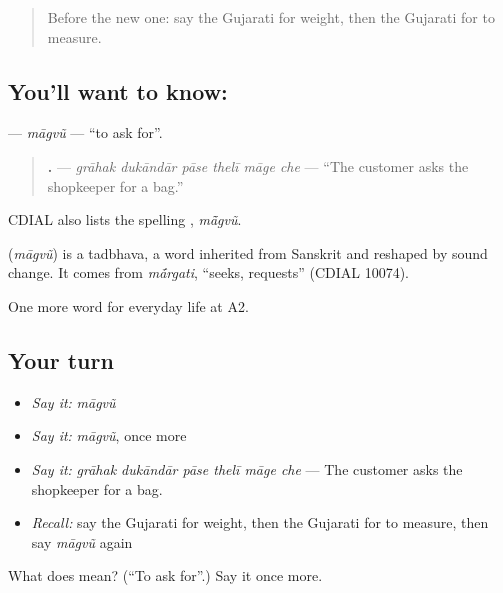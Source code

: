 \label{lesson:GU-C184-magvu}



\begin{quote}
Before the new one: say the Gujarati for weight, then the Gujarati for to measure.
\end{quote}

\subsection*{You'll want to know: }
\textbf{} — \emph{māgvũ} — \textquotedblleft{}to ask for\textquotedblright{}.

\begin{quote}
\textbf{     .} — \emph{grāhak dukāndār pāse thelī māge che} — \textquotedblleft{}The customer asks the shopkeeper for a bag.\textquotedblright{}
\end{quote}

CDIAL also lists the spelling \textbf{}, \emph{mā̃gvũ}.

\begin{cousinweb}
\textbf{} (\emph{māgvũ}) is a tadbhava, a word inherited from Sanskrit and reshaped by sound change. It comes from \emph{m\'{\={a}}rgati}, \textquotedblleft{}seeks, requests\textquotedblright{} (CDIAL 10074).
\end{cousinweb}

\begin{grammarlens}[title={What you've built}]
One more word for everyday life at A2.
\end{grammarlens}

\subsection*{Your turn}
\begin{itemize}
\raggedright
  \item \emph{Say it:} \emph{māgvũ}
  \item \emph{Say it:} \emph{māgvũ}, once more
  \item \emph{Say it:} \emph{grāhak dukāndār pāse thelī māge che} — The customer asks the shopkeeper for a bag.
  \item \emph{Recall:} say the Gujarati for weight, then the Gujarati for to measure, then say \emph{māgvũ} again
\end{itemize}

\begin{tcolorbox}[breakable,colback=teal!4,colframe=teal!35!black,title={Before you move on}]
What does  mean? (\textquotedblleft{}To ask for\textquotedblright{}.) Say it once more.
\end{tcolorbox}
